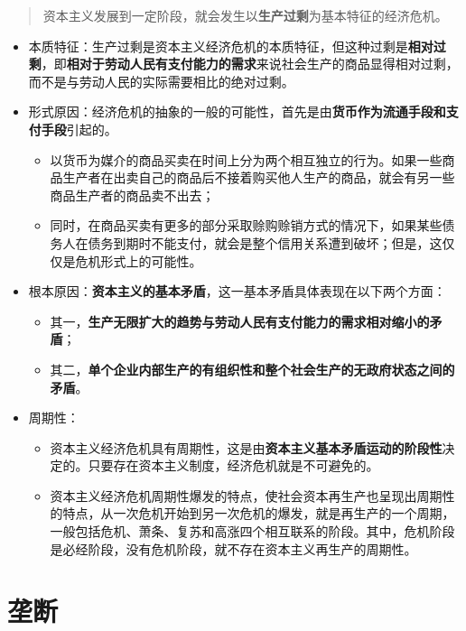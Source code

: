 \documentclass[
]{article}
\begin{document}
\begin{quote}
资本主义发展到一定阶段，就会发生以\textbf{生产过剩}为基本特征的经济危机。
\end{quote}

\begin{itemize}
\item
  本质特征：生产过剩是资本主义经济危机的本质特征，但这种过剩是\textbf{相对过剩}，即\textbf{相对于劳动人民有支付能力的需求}来说社会生产的商品显得相对过剩，而不是与劳动人民的实际需要相比的绝对过剩。
\item
  形式原因：经济危机的抽象的一般的可能性，首先是由\textbf{货币作为流通手段和支付手段}引起的。

  \begin{itemize}
  \item
    以货币为媒介的商品买卖在时间上分为两个相互独立的行为。如果一些商品生产者在出卖自己的商品后不接着购买他人生产的商品，就会有另一些商品生产者的商品卖不出去；
  \item
    同时，在商品买卖有更多的部分采取赊购赊销方式的情况下，如果某些债务人在债务到期时不能支付，就会是整个信用关系遭到破坏；但是，这仅仅是危机形式上的可能性。
  \end{itemize}
\item
  根本原因：\textbf{资本主义的基本矛盾}，这一基本矛盾具体表现在以下两个方面：

  \begin{itemize}
  \item
    其一，\textbf{生产无限扩大的趋势与劳动人民有支付能力的需求相对缩小的矛盾}；
  \item
    其二，\textbf{单个企业内部生产的有组织性和整个社会生产的无政府状态之间的矛盾}。
  \end{itemize}
\item
  周期性：

  \begin{itemize}
  \item
    资本主义经济危机具有周期性，这是由\textbf{资本主义基本矛盾运动的阶段性}决定的。只要存在资本主义制度，经济危机就是不可避免的。
  \item
    资本主义经济危机周期性爆发的特点，使社会资本再生产也呈现出周期性的特点，从一次危机开始到另一次危机的爆发，就是再生产的一个周期，一般包括危机、萧条、复苏和高涨四个相互联系的阶段。其中，危机阶段是必经阶段，没有危机阶段，就不存在资本主义再生产的周期性。
  \end{itemize}
\end{itemize}

\hypertarget{ux5784ux65ad}{%
\section{垄断}\label{ux5784ux65ad}}
\end{document}
